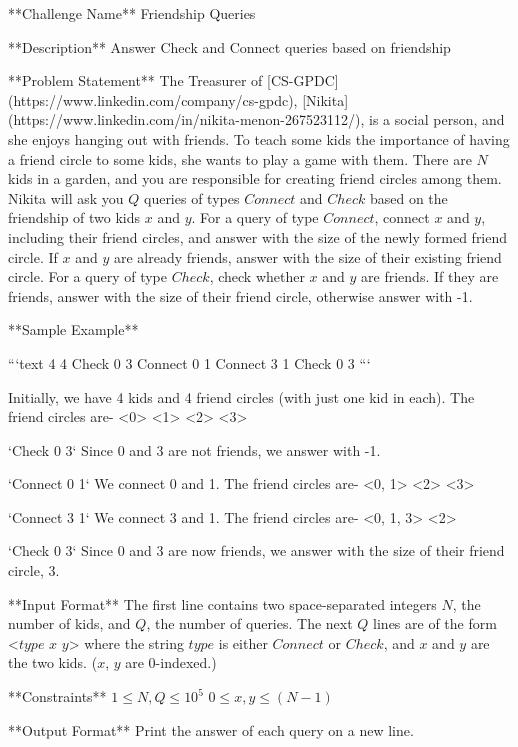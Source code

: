 **Challenge Name**  
Friendship Queries

**Description**  
Answer Check and Connect queries based on friendship

**Problem Statement**  
The Treasurer of [CS-GPDC](https://www.linkedin.com/company/cs-gpdc), [Nikita](https://www.linkedin.com/in/nikita-menon-267523112/), is a social person, and she enjoys hanging out with friends. To teach some kids the importance of having a friend circle to some kids, she wants to play a game with them. There are $N$ kids in a garden, and you are responsible for creating friend circles among them. Nikita will ask you $Q$ queries of types $Connect$ and $Check$ based on the friendship of two kids $x$ and $y$. For a query of type $Connect$, connect $x$ and $y$, including their friend circles, and answer with the size of the newly formed friend circle. If $x$ and $y$ are already friends, answer with the size of their existing friend circle. For a query of type $Check$, check whether $x$ and $y$ are friends. If they are friends, answer with the size of their friend circle, otherwise answer with -1.  

**Sample Example**  

```text
4 4
Check 0 3
Connect 0 1
Connect 3 1
Check 0 3
```

Initially, we have 4 kids and 4 friend circles (with just one kid in each).  
The friend circles are- <0> <1> <2> <3>  

`Check 0 3`  
Since 0 and 3 are not friends, we answer with -1.  

`Connect 0 1`  
We connect 0 and 1.  
The friend circles are- <0, 1> <2> <3>  

`Connect 3 1`  
We connect 3 and 1.  
The friend circles are- <0, 1, 3> <2>  

`Check 0 3`  
Since 0 and 3 are now friends, we answer with the size of their friend circle, 3.  



**Input Format**  
The first line contains two space-separated integers $N$, the number of kids, and $Q$, the number of queries.  
The next $Q$ lines are of the form <$type$ $x$ $y$> where the string $type$ is either $Connect$ or $Check$, and $x$ and $y$ are the two kids. ($x$, $y$ are 0-indexed.)

**Constraints**  
$1 \leq N, Q \leq 10^5$  
$0 \leq x, y \leq (N-1)$  

**Output Format**  
Print the answer of each query on a new line.
